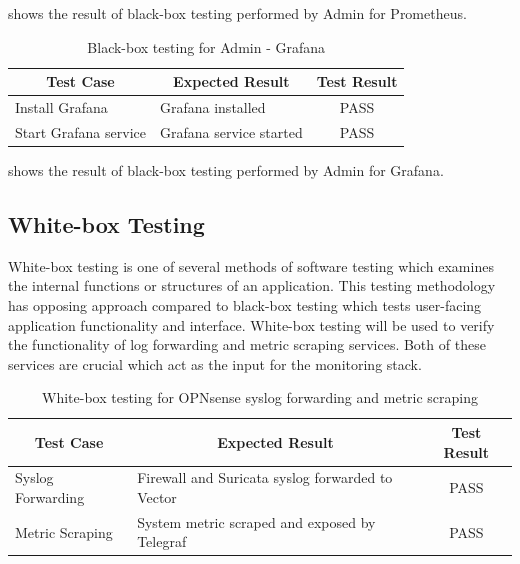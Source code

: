 \documentclass[../index.tex]{subfiles}
\begin{document}
 shows the result of black-box testing performed by Admin for
Prometheus.

\begin{table}[h!]
  \begin{tabularx}{\textwidth}{|m{12em}|X|c|} 
    \hline
    \multicolumn{1}{|c|}{Test Case} & \multicolumn{1}{c|}{Expected Result} & \multicolumn{1}{c|}{Test Result} \\
    \hline
    Install Grafana                 & Grafana installed                    & PASS \\ 
    Start Grafana service           & Grafana service started              & PASS \\ 
    \hline
  \end{tabularx}
  \caption{Black-box testing for Admin - Grafana}
  \label{table:blackbox_grafana}
\end{table}

 shows the result of black-box testing performed by Admin for Grafana.

\subsection{White-box Testing}

White-box testing is one of several methods of software testing which examines the internal
functions or structures of an application. This testing methodology has opposing approach compared
to black-box testing which tests user-facing application functionality and interface. White-box
testing will be used to verify the functionality of log forwarding and metric scraping services.
Both of these services are crucial which act as the input for the monitoring stack.

\begin{table}[h!]
  \begin{tabularx}{\textwidth}{|m{8em}|X|c|} 
    \hline
    \multicolumn{1}{|c|}{Test Case} & \multicolumn{1}{c|}{Expected Result} & \multicolumn{1}{c|}{Test Result} \\
    \hline
    Syslog Forwarding               & Firewall and Suricata syslog forwarded to Vector & PASS \\ 
    Metric Scraping                 & System metric scraped and exposed by Telegraf & PASS \\ 
    \hline
  \end{tabularx}
  \caption{White-box testing for OPNsense syslog forwarding and metric scraping}
  \label{table:whitebox_opnsense}
\end{table}
\end{document}
